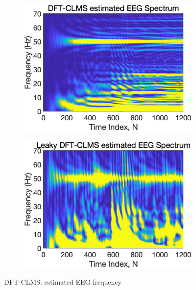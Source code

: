\begin{figure}[htb]
     \centering
     \hspace{0.4cm}
     \begin{subfigure}[b]{0.4\textwidth}
         \centering
         \includegraphics[width=\textwidth]{fig/33/33d1.eps}
     \end{subfigure}
    \hspace{0.4cm}
     \begin{subfigure}[b]{0.4\textwidth}
         \centering
         \includegraphics[width=\textwidth]{fig/33/33d2.eps}
     \end{subfigure}
     \caption{DFT-CLMS: estimated EEG frequency}
     \label{fig:3_3_d}
\end{figure}